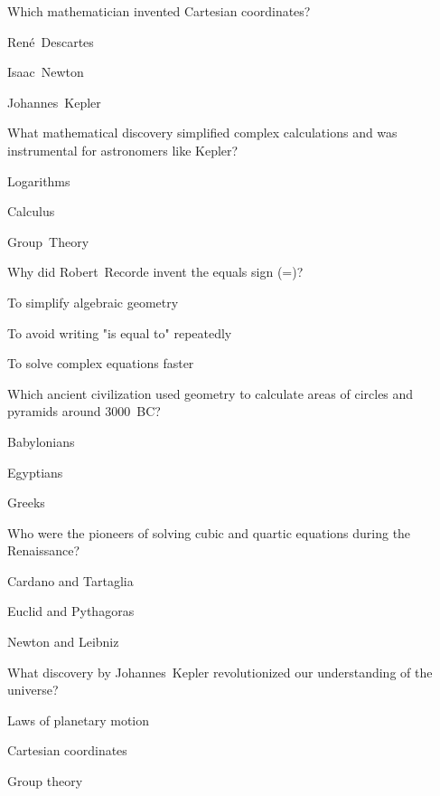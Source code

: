 \begin{enhancedmcq}{Which mathematician invented Cartesian coordinates?}
\item René Descartes
\item Isaac Newton
\item Johannes Kepler

\end{enhancedmcq}
\begin{enhancedmcq}{What mathematical discovery simplified complex calculations and was instrumental for astronomers like Kepler?}
\item Logarithms
\item Calculus
\item Group Theory

\end{enhancedmcq}
\begin{enhancedmcq}{Why did Robert Recorde invent the equals sign (=)?}
\item To simplify algebraic geometry
\item To avoid writing "is equal to" repeatedly
\item To solve complex equations faster

\end{enhancedmcq}
\begin{enhancedmcq}{Which ancient civilization used geometry to calculate areas of circles and pyramids around 3000 BC?}
\item Babylonians
\item Egyptians
\item Greeks

\end{enhancedmcq}
\begin{enhancedmcq}{Who were the pioneers of solving cubic and quartic equations during the Renaissance?}
\item Cardano and Tartaglia
\item Euclid and Pythagoras
\item Newton and Leibniz

\end{enhancedmcq}
\begin{enhancedmcq}{What discovery by Johannes Kepler revolutionized our understanding of the universe?}
\item Laws of planetary motion
\item Cartesian coordinates
\item Group theory

\end{enhancedmcq}
